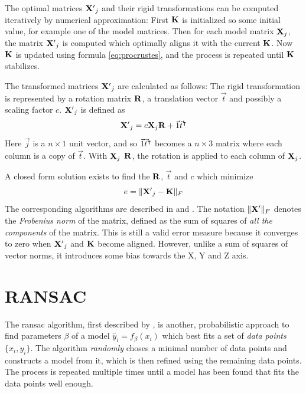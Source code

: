The optimal matrices $\mathbf{X'}_j$ and their rigid transformations can be computed iteratively by numerical approximation: \cite{Told2010} First $\mathbf{K}$ is initialized so some initial value, for example one of the model matrices. Then for each model matrix $\mathbf{X}_j$, the matrix $\mathbf{X'}_j$ is computed which optimally aligns it with the current $\mathbf{K}$. Now $\mathbf{K}$ is updated using formula \ref{eq:procrustes}, and the process is repeated until $\mathbf{K}$ stabilizes.

The transformed matrices $\mathbf{X'}_j$ are calculated as follows: The rigid transformation is represented by a rotation matrix $\mathbf{R}$, a translation vector $\vec{t}$ and possibly a scaling factor $c$. $\mathbf{X'}_j$ is defined as
\begin{equation}
\mathbf{X'}_j = c \mathbf{X}_j \mathbf{R} + \vec{1} \vec{t}^\intercal
\end{equation}
Here $\vec{j}$ is a $n \times 1$ unit vector, and so $\vec{1} \vec{t}^\intercal$ becomes a $n \times 3$ matrix where each column is a copy of $\vec{t}$. With $\mathbf{X}_j$ $\mathbf{R}$, the rotation is applied to each column of $\mathbf{X}_j$.

A closed form solution exists to find the $\mathbf{R}$, $\vec{t}$ and $c$ which minimize
\begin{equation}
e = \| \mathbf{X'}_j - \mathbf{K} \|_{F}
\end{equation} 
The corresponding algorithms are described in \cite{Scho1970} and \cite{Scho1966}. The notation $\| \mathbf{X'} \|_{F}$ denotes the \emph{Frobenius norm} of the matrix, defined as the sum of squares of \emph{all the components} of the matrix. This is still a valid error measure because it converges to zero when $\mathbf{X'}_j$ and $\mathbf{K}$ become aligned. However, unlike a sum of squares of vector norms, it introduces some bias towards the X, Y and Z axis.


\section{RANSAC}
The \gls{ransac} algorithm, first described by \cite{Fisc1980}, is another, probabilistic approach to find parameters $\beta$ of a model $\hat{y}_i = f_\beta(x_i)$ which best fits a set of \emph{data points} $\{ x_i, y_i \}$. The algorithm \emph{randomly} choses a minimal number of data points and constructs a model from it, which is then refined using the remaining data points. The process is repeated multiple times until a model has been found that fits the data points well enough.

